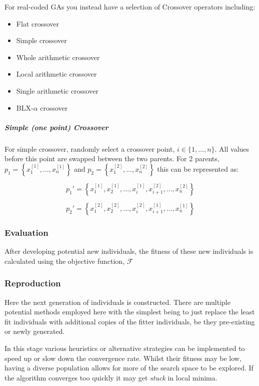 For real-coded GAs you instead have a selection of Crossover operators including:

\begin{itemize}
    \item Flat crossover
    \item Simple crossover
    \item Whole arithmetic crossover
    \item Local arithmetic crossover
    \item Single arithmetic crossover
    \item BLX-$\alpha$ crossover
\end{itemize}


\subparagraph{Simple (one point) Crossover}\label{imp:SimpCross}

For simple crossover, randomly select a crossover point, $i \in \{1,\ldots,n \}$. All values before this point are swapped between the two parents. For 2 parents, $p_1 = \left\{ x_1^{[1]},\ldots,x_n^{[1]}\right\}$ and $p_2 = \left\{ x_1^{[2]},\ldots,x_n^{[2]}\right\}$ this can be represented as:

\begin{equation}
    p_1' = \left\{ x_1^{[1]},x_2^{[1]}, \ldots, x_i^{[1]}, x_{i+1}^{[2]},\ldots, x_n^{[2]} \right\} 
\end{equation}

\begin{equation}
    p_2' = \left\{ x_1^{[2]},x_2^{[2]}, \ldots, x_i^{[2]}, x_{i+1}^{[1]},\ldots, x_n^{[1]} \right\}
\end{equation}

\subsubsection{Evaluation}
After developing potential new individuals, the fitness of these new individuals is calculated using the objective function, $\mathcal{F}$

\subsubsection{Reproduction}
Here the next generation of individuals is constructed. There are multiple potential methods employed here with the simplest being to just replace the least fit individuals with additional copies of the fitter individuals, be they pre-existing or newly generated.

In this stage various heuristics or alternative strategies can be implemented to speed up or slow down the convergence rate. Whilst their fitness may be low, having a diverse population allows for more of the search space to be explored. If the algorithm converges too quickly it may get \textit{stuck} in local minima. 



